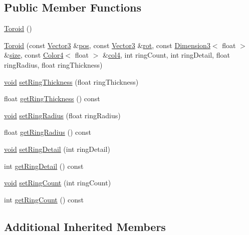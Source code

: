 \subsection*{Public Member Functions}
\begin{DoxyCompactItemize}
\item 
\hyperlink{class_toroid_a72f8eb10bf54ff1676908153c04a79f9}{Toroid} ()
\item 
\hyperlink{class_toroid_adf397c02a17310e05a7fa08c0f0277fe}{Toroid} (const \hyperlink{class_vector3}{Vector3} \&\hyperlink{class_geom_base_ace2fc0557767dbb702aaf1655a85ed92}{pos}, const \hyperlink{class_vector3}{Vector3} \&\hyperlink{class_geom_base_a7de363bab1e976c73e495cf973a51de7}{rot}, const \hyperlink{class_dimension3}{Dimension3}$<$ float $>$ \&\hyperlink{gl3_8h_a79ef9eb3e59c4bb34c4b9fbeb8d28ff7}{size}, const \hyperlink{class_color4}{Color4}$<$ float $>$ \&\hyperlink{class_geom_base_acd58b67fcdac4428f66bea2c58c3aad8}{col4}, int ring\-Count, int ring\-Detail, float ring\-Radius, float ring\-Thickness)
\item 
\hyperlink{glutf90_8h_ac778d6f63f1aaf8ebda0ce6ac821b56e}{void} \hyperlink{class_toroid_ad9709d873eaff3e16967c3262fdb1b42}{set\-Ring\-Thickness} (float ring\-Thickness)
\item 
float \hyperlink{class_toroid_af82e7d983dfd2edb46b054400ebb3786}{get\-Ring\-Thickness} () const 
\item 
\hyperlink{glutf90_8h_ac778d6f63f1aaf8ebda0ce6ac821b56e}{void} \hyperlink{class_toroid_af673e6d5178ac465d7b231736371f155}{set\-Ring\-Radius} (float ring\-Radius)
\item 
float \hyperlink{class_toroid_a775af2e481d82fdccc596557af2f751a}{get\-Ring\-Radius} () const 
\item 
\hyperlink{glutf90_8h_ac778d6f63f1aaf8ebda0ce6ac821b56e}{void} \hyperlink{class_toroid_ad47379d382aa5ca031c2fb6f077030d9}{set\-Ring\-Detail} (int ring\-Detail)
\item 
int \hyperlink{class_toroid_ae1a62c70d03c1b057fdd8e5967c014a2}{get\-Ring\-Detail} () const 
\item 
\hyperlink{glutf90_8h_ac778d6f63f1aaf8ebda0ce6ac821b56e}{void} \hyperlink{class_toroid_a1480fba61581c56caf04ab00800d5cc1}{set\-Ring\-Count} (int ring\-Count)
\item 
int \hyperlink{class_toroid_a9fc40540a5a59a183f360d004d630979}{get\-Ring\-Count} () const 
\end{DoxyCompactItemize}
\subsection*{Additional Inherited Members}


